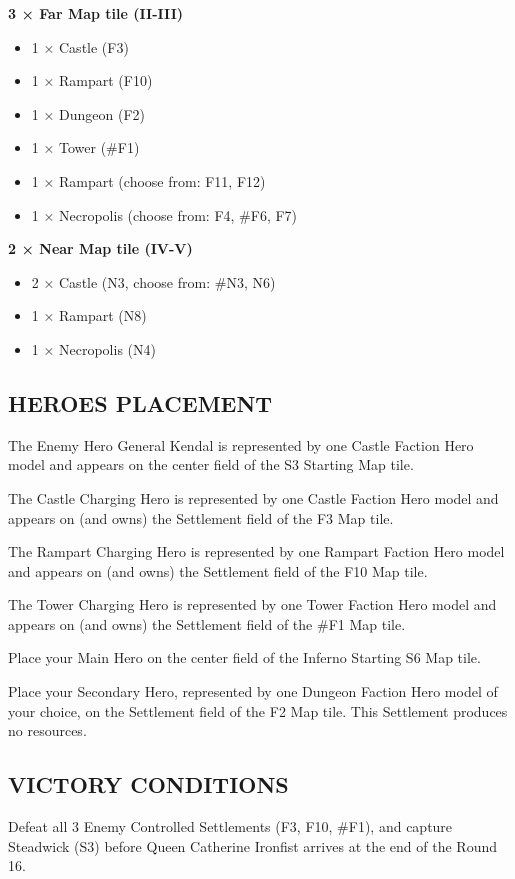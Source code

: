 \begin{multicols*}{2}
\textbf{3 × Far Map tile (II-III)}
\begin{itemize}
  \item 1 × Castle (F3)
  \item 1 × Rampart (F10)
  \item 1 × Dungeon (F2)
  \item 1 × Tower (\#F1)
  \item 1 × Rampart (choose from: F11, F12)
  \item 1 × Necropolis (choose from: F4, \#F6, F7)
\end{itemize}

\textbf{2 × Near Map tile (IV-V)}
\begin{itemize}
  \item 2 × Castle (N3, choose from: \#N3, N6)
  \item 1 × Rampart (N8)
  \item 1 × Necropolis (N4)
\end{itemize}

\subsection*{\MakeUppercase{Heroes placement}}

The Enemy Hero General Kendal is represented by one Castle Faction Hero
model and appears on the center field of the S3 Starting Map tile.

The Castle Charging Hero is represented by one Castle Faction Hero model
and appears on (and owns) the Settlement field of the F3 Map tile.

The Rampart Charging Hero is represented by one Rampart Faction Hero model
and appears on (and owns) the Settlement field of the F10 Map tile.

The Tower Charging Hero is represented by one Tower Faction Hero model
and appears on (and owns) the Settlement field of the \#F1 Map tile.

Place your Main Hero on the center field of the Inferno Starting S6 Map tile.

Place your Secondary Hero, represented by one Dungeon Faction Hero model of your choice,
on the Settlement field of the F2 Map tile. This Settlement produces no resources.

\subsection*{\MakeUppercase{Victory Conditions}}

Defeat all 3 Enemy Controlled Settlements (F3, F10, \#F1), and capture Steadwick (S3) before
Queen Catherine Ironfist arrives at the end of the Round 16.


\end{multicols*}
